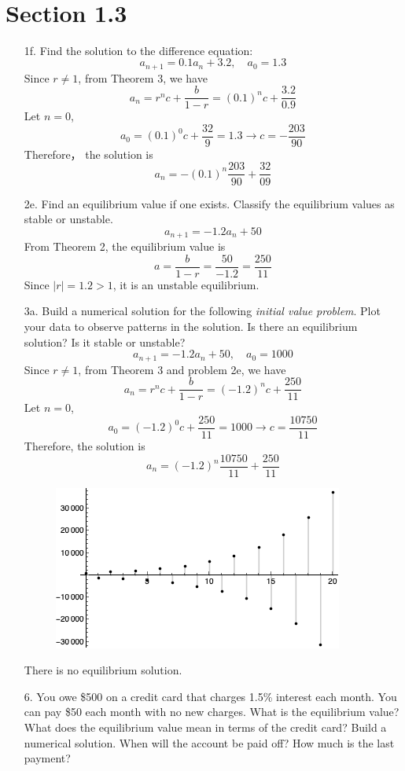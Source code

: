 \documentclass[10pt]{report}
\title{
	\courseTitle\\
	\hwNo\\
	\hwDate
}
\author{\hwAuther}
\date{}
\newcommand{\abs}[1] {\left| #1 \right|}
\begin{document}
\maketitle



\section*{Section 1.3}
\begin{enumerate}
	\item [1f.]
	Find the solution to the difference equation:
	\[a_{n+1} = 0.1 a_n + 3.2, \quad a_0 = 1.3\]
	Since $r \ne 1$, from Theorem 3, we have
	\[
	a_n = r^n c + \frac{b}{1-r} = (0.1)^n c + \frac{3.2}{0.9}
	\]
	Let $n = 0$,
	\[
	a_0 = (0.1)^0 c + \frac{32}{9} = 1.3 \to c = - \frac{203}{90}
	\]
	Therefore， the solution is
	\[
	a_n = -(0.1)^n \frac{203}{90} + \frac{32}{09}
	\]
	
	\item [2e.]
	Find an equilibrium value if one exists. Classify the equilibrium values as stable or unstable.
	\[a_{n+1} = -1.2 a_n + 50\]
	From Theorem 2, the equilibrium value is
	\[
	a = \frac{b}{1-r} = \frac{50}{-1.2} = \frac{250}{11}
	\]
	Since $\abs{r} = 1.2 > 1$, it is an unstable equilibrium.
	
	\item [3a.]
	Build a numerical solution for the following \textit{initial value problem}. Plot your data to observe patterns in the solution. Is there an equilibrium solution? Is it stable or unstable?
	\[a_{n+1} = -1.2 a_n + 50, \quad a_0 = 1000\]
	Since $r \ne 1$, from Theorem 3 and problem 2e, we have
	\[
	a_n = r^n c + \frac{b}{1-r} = (-1.2)^n c + \frac{250}{11}
	\]
	Let $n = 0$,
	\[
	a_0 = (-1.2)^0 c + \frac{250}{11} = 1000 \to c = \frac{10750}{11}
	\]
	Therefore, the solution is
	\[
	a_n = (-1.2)^n \frac{10750}{11} + \frac{250}{11}
	\]
	\begin{figure}[H]
		\centering
		\includegraphics[width=0.5\linewidth]{s1_3/3a.png}
	\end{figure}
	There is no equilibrium solution.
	
	\item [6.]
	You owe \$500 on a credit card that charges 1.5\% interest each month. You can pay \$50 each month with no new charges. What is the equilibrium value? What does the equilibrium value mean in terms of the credit card? Build a numerical solution. When will the account be paid off? How much is the last payment?
	

\end{enumerate}
\end{document}
